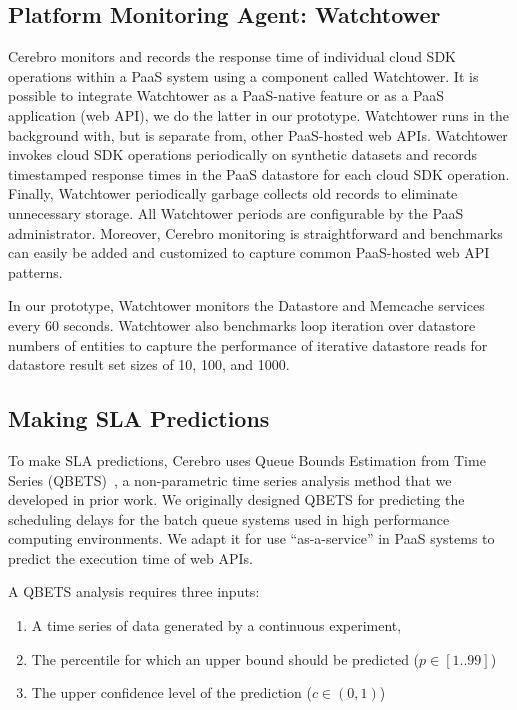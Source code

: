 \subsection{Platform Monitoring Agent: Watchtower}
Cerebro monitors and records the response time of individual
cloud SDK operations within a PaaS system using a component called Watchtower.  
It is possible to integrate Watchtower as a PaaS-native feature or as
a PaaS application (web API), we do the latter in our prototype.
Watchtower runs in the background with, but is separate from, 
other PaaS-hosted web APIs.
Watchtower invokes cloud SDK operations periodically on synthetic datasets and 
records timestamped response times in the PaaS datastore for each cloud SDK
operation.
Finally, Watchtower periodically garbage collects old records 
to eliminate unnecessary storage. All Watchtower periods are configurable by
the PaaS administrator. Moreover, Cerebro monitoring is straightforward and
benchmarks can easily be added and customized to capture common PaaS-hosted web API
patterns.

In our prototype, Watchtower monitors the Datastore and Memcache services
every 60 seconds.  Watchtower also
benchmarks loop iteration over datastore numbers of entities  to capture
the performance of iterative datastore reads for datastore result set sizes 
of 10, 100, and 1000.


\subsection{Making SLA Predictions}

To make SLA predictions, Cerebro uses 
Queue Bounds Estimation from Time Series (QBETS)~\cite{Nurmi:2007:QQB:1791551.1791556},
a non-parametric time series analysis method that we developed in prior work.
We originally designed QBETS for
predicting the scheduling delays for the batch queue systems 
used in high performance computing environments. 
We adapt it for use ``as-a-service'' in PaaS systems 
to predict the execution time of web APIs.

A QBETS analysis requires three inputs:
\begin{enumerate}
\item A time series of data generated by a continuous experiment,
\item The percentile for which an upper bound should be predicted ($p \in [1..99]$)
\item The upper confidence level of the prediction ($c \in (0,1)$)
\end{enumerate}

